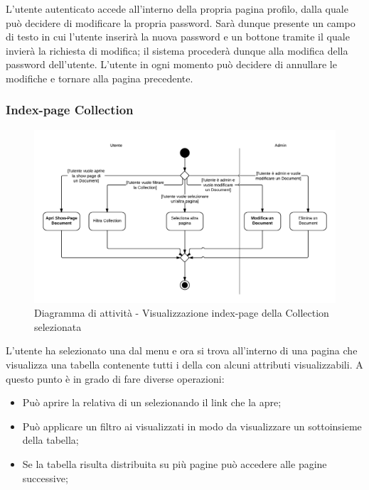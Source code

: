 L'utente autenticato accede all'interno della propria pagina profilo, dalla quale può decidere di modificare la propria password. Sarà dunque presente un campo di testo in cui l'utente inserirà la nuova password e un bottone tramite il quale invierà la richiesta di modifica; il sistema  procederà dunque alla modifica della password dell'utente. L'utente in ogni momento può decidere di annullare le modifiche e tornare alla pagina precedente.

\subsubsection{Index-page Collection}

\begin{figure}[H]
\centering
\includegraphics[scale=0.2]{uml/attivita/MaaP - Index-page.png}
\caption{Diagramma di attività - Visualizzazione index-page della Collection selezionata}
\end{figure}

L'utente ha selezionato una  dal menu e ora si trova all'interno di una pagina che visualizza una tabella contenente tutti i  della  con alcuni attributi visualizzabili. A questo punto è in grado di fare diverse operazioni:

\begin{itemize}

	\item Può aprire la relativa  di un  selezionando il link che la apre;
	\item Può applicare un filtro ai  visualizzati in modo da visualizzare un sottoinsieme della tabella;
	\item Se la tabella risulta distribuita su più pagine può accedere alle pagine successive;

\end{itemize}

